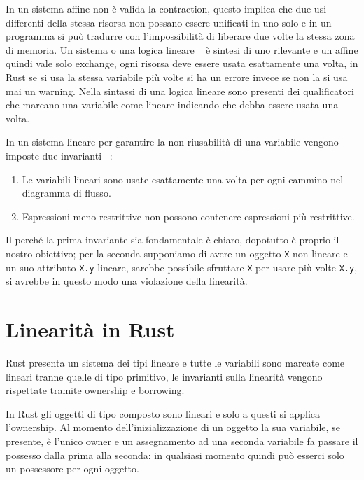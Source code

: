 \documentclass[Lau,binding=0.6cm]{sapthesis}
\begin{document}
In un sistema affine non è valida la contraction, questo implica che due usi differenti della stessa risorsa non possano essere unificati in uno solo e in un programma si può tradurre con l'impossibilità di liberare due volte la stessa zona di memoria.
Un sistema o una logica lineare ~\cite{girard:linear_logic} è sintesi di uno rilevante e un affine quindi vale solo exchange, ogni risorsa deve essere usata esattamente una volta, in Rust se si usa la stessa variabile più volte si ha un errore invece se non la si usa mai un warning.
Nella sintassi di una logica lineare sono presenti dei qualificatori che marcano una variabile come lineare indicando che debba essere usata una volta.

In un sistema lineare per garantire la non riusabilità di una variabile vengono imposte due invarianti ~\cite{walker:linear_logic}:

\begin{enumerate}
    \item Le variabili lineari sono usate esattamente una volta per ogni cammino nel diagramma di flusso.
    \item Espressioni meno restrittive non possono contenere espressioni più restrittive. 
\end{enumerate}

Il perché la prima invariante sia fondamentale è chiaro, dopotutto è proprio il nostro obiettivo; per la seconda supponiamo di avere un oggetto \texttt{X} non lineare e un suo attributo \texttt{X.y} lineare, sarebbe possibile sfruttare \texttt{X} per usare più volte \texttt{X.y}, si avrebbe in questo modo una violazione della linearità. 

\section{Linearità in Rust} \label{sec:Rust_linear}

Rust presenta un sistema dei tipi lineare e tutte le variabili sono marcate come lineari tranne quelle di tipo primitivo, le invarianti sulla linearità vengono rispettate tramite ownership e borrowing.

In Rust gli oggetti di tipo composto sono lineari e solo a questi si applica l'ownership.
Al momento dell'inizializzazione di un oggetto la sua variabile, se presente, è l'unico owner e un assegnamento ad una seconda variabile fa passare il possesso dalla prima alla seconda: in qualsiasi momento quindi può esserci solo un possessore per ogni oggetto. 
\end{document}
